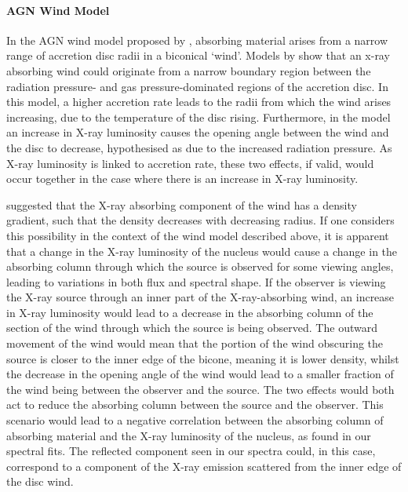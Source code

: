 \documentclass[letters,useAMS,usenatbib]{samnote}
\begin{document}
\paragraph{AGN Wind Model}


In the AGN wind model proposed by \citet{elvis}, absorbing material arises from a narrow range of accretion disc radii in a biconical `wind'. Models by \citet{nicastro}
show that an x-ray absorbing wind could originate from a narrow boundary region between the radiation pressure- and gas pressure-dominated regions of the accretion disc.
In this model, a higher accretion rate leads to the radii from which the wind arises increasing, due to the temperature of the disc rising. Furthermore, in
the \citet{elvis} model an increase in X-ray luminosity causes the opening angle between the wind and the disc to decrease, hypothesised as due to the increased radiation
pressure. As X-ray luminosity is linked to accretion rate, these two effects, if valid, would occur together in the case where there is an increase in X-ray luminosity.

\citet{tombesi} suggested that the X-ray absorbing component of the wind has a density gradient, such that the density decreases with decreasing radius. If one considers
this
possibility in the context of the wind model described above, it is apparent that a change in the X-ray luminosity of the nucleus would cause a change in the absorbing
column through which the source is observed for some viewing angles, leading to variations in both flux and spectral shape. If the observer is viewing the X-ray source
through an inner part of the X-ray-absorbing wind, an increase in X-ray luminosity would lead to a decrease in the absorbing column of the section of the wind through
which the source is being observed. The outward movement of the wind would mean that the portion of the wind obscuring the source is closer to the inner edge of the
bicone, meaning it is lower density, whilst the decrease in the opening angle of the wind would lead to a smaller fraction of the wind being between the observer and the
source. The two effects would both act to reduce the absorbing column between the source and the observer. This scenario would lead to a negative correlation between the
absorbing column of absorbing material and the X-ray luminosity of the nucleus, as found in our spectral fits. The reflected component seen in our spectra could, in this
case, correspond to a component of the X-ray emission scattered from the inner edge of the disc wind.
\end{document}
